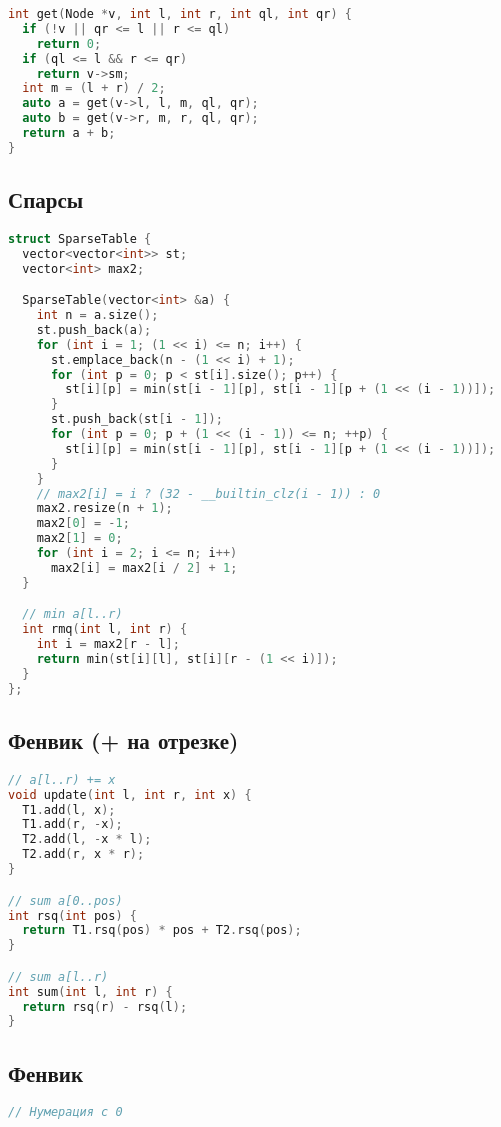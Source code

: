 \documentclass[10pt,a4paper,landscape,twosided]{extarticle}
\begin{document}
\begin{multicols*}{3}
\begin{lstlisting}[language=C++]
int get(Node *v, int l, int r, int ql, int qr) {
  if (!v || qr <= l || r <= ql)
    return 0;
  if (ql <= l && r <= qr)
    return v->sm;
  int m = (l + r) / 2;
  auto a = get(v->l, l, m, ql, qr);
  auto b = get(v->r, m, r, ql, qr);
  return a + b;
}

\end{lstlisting}

\subsection{Спарсы}
\begin{lstlisting}[language=C++]
struct SparseTable {
  vector<vector<int>> st;
  vector<int> max2;

  SparseTable(vector<int> &a) {
    int n = a.size();
    st.push_back(a);
    for (int i = 1; (1 << i) <= n; i++) {
      st.emplace_back(n - (1 << i) + 1);
      for (int p = 0; p < st[i].size(); p++) {
        st[i][p] = min(st[i - 1][p], st[i - 1][p + (1 << (i - 1))]);
      }
      st.push_back(st[i - 1]);
      for (int p = 0; p + (1 << (i - 1)) <= n; ++p) {
        st[i][p] = min(st[i - 1][p], st[i - 1][p + (1 << (i - 1))]);
      }
    }
    // max2[i] = i ? (32 - __builtin_clz(i - 1)) : 0
    max2.resize(n + 1);
    max2[0] = -1;
    max2[1] = 0;
    for (int i = 2; i <= n; i++)
      max2[i] = max2[i / 2] + 1;
  }

  // min a[l..r)
  int rmq(int l, int r) {
    int i = max2[r - l];
    return min(st[i][l], st[i][r - (1 << i)]);
  }
};
\end{lstlisting}

\subsection{Фенвик (+ на отрезке)}
\begin{lstlisting}[language=C++]
// a[l..r) += x
void update(int l, int r, int x) {
  T1.add(l, x);
  T1.add(r, -x);
  T2.add(l, -x * l);
  T2.add(r, x * r);
}

// sum a[0..pos)
int rsq(int pos) {
  return T1.rsq(pos) * pos + T2.rsq(pos);
}

// sum a[l..r)
int sum(int l, int r) {
  return rsq(r) - rsq(l);
}

\end{lstlisting}

\subsection{Фенвик}
\begin{lstlisting}[language=C++]
// Нумерация с 0


\end{lstlisting}
\end{multicols*}
\end{document}
